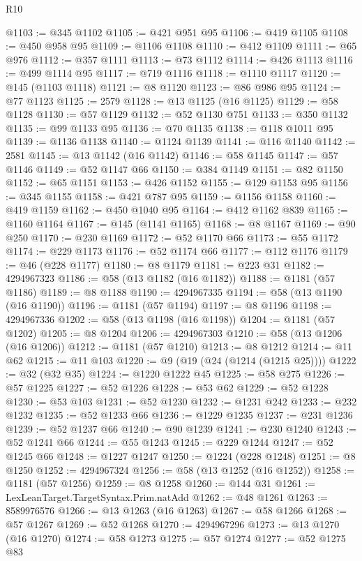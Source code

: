\begin{lexlean}{R10}
\begin{coremodule}
@1103 := @345 @1102
@1105 := @421 @951 @95
@1106 := @419 @1105
@1108 := @450 @958 @95
@1109 := @1106 @1108
@1110 := @412 @1109
@1111 := @65 @976
@1112 := @357 @1111
@1113 := @73 @1112
@1114 := @426 @1113
@1116 := @499 @1114 @95
@1117 := @719 @1116
@1118 := @1110 @1117
@1120 := @145 (@1103 @1118)
@1121 := @8 @1120
@1123 := @86 @986 @95
@1124 := @77 @1123
@1125 := 2579
@1128 := @13 @1125 (@16 @1125)
@1129 := @58 @1128
@1130 := @57 @1129
@1132 := @52 @1130 @751
@1133 := @350 @1132
@1135 := @99 @1133 @95
@1136 := @70 @1135
@1138 := @118 @1011 @95
@1139 := @1136 @1138
@1140 := @1124 @1139
@1141 := @116 @1140
@1142 := 2581
@1145 := @13 @1142 (@16 @1142)
@1146 := @58 @1145
@1147 := @57 @1146
@1149 := @52 @1147 @66
@1150 := @384 @1149
@1151 := @82 @1150
@1152 := @65 @1151
@1153 := @426 @1152
@1155 := @129 @1153 @95
@1156 := @345 @1155
@1158 := @421 @787 @95
@1159 := @1156 @1158
@1160 := @419 @1159
@1162 := @450 @1040 @95
@1164 := @412 @1162 @839
@1165 := @1160 @1164
@1167 := @145 (@1141 @1165)
@1168 := @8 @1167
@1169 := @90 @250
@1170 := @230 @1169
@1172 := @52 @1170 @66
@1173 := @55 @1172
@1174 := @229 @1173
@1176 := @52 @1174 @66
@1177 := @112 @1176
@1179 := @46 (@228 @1177)
@1180 := @8 @1179
@1181 := @223 @31
@1182 := 4294967323
@1186 := @58 (@13 @1182 (@16 @1182))
@1188 := @1181 (@57 @1186)
@1189 := @8 @1188
@1190 := 4294967335
@1194 := @58 (@13 @1190 (@16 @1190))
@1196 := @1181 (@57 @1194)
@1197 := @8 @1196
@1198 := 4294967336
@1202 := @58 (@13 @1198 (@16 @1198))
@1204 := @1181 (@57 @1202)
@1205 := @8 @1204
@1206 := 4294967303
@1210 := @58 (@13 @1206 (@16 @1206))
@1212 := @1181 (@57 @1210)
@1213 := @8 @1212
@1214 := @11 @62
@1215 := @11 @103
@1220 := @9 (@19 (@24 (@1214 (@1215 @25))))
@1222 := @32 (@32 @35)
@1224 := @1220 @1222 @45
@1225 := @58 @275
@1226 := @57 @1225
@1227 := @52 @1226
@1228 := @53 @62
@1229 := @52 @1228
@1230 := @53 @103
@1231 := @52 @1230
@1232 := @1231 @242
@1233 := @232 @1232
@1235 := @52 @1233 @66
@1236 := @1229 @1235
@1237 := @231 @1236
@1239 := @52 @1237 @66
@1240 := @90 @1239
@1241 := @230 @1240
@1243 := @52 @1241 @66
@1244 := @55 @1243
@1245 := @229 @1244
@1247 := @52 @1245 @66
@1248 := @1227 @1247
@1250 := @1224 (@228 @1248)
@1251 := @8 @1250
@1252 := 4294967324
@1256 := @58 (@13 @1252 (@16 @1252))
@1258 := @1181 (@57 @1256)
@1259 := @8 @1258
@1260 := @144 @31
@1261 := LexLeanTarget.TargetSyntax.Prim.natAdd
@1262 := @48 @1261
@1263 := 8589976576
@1266 := @13 @1263 (@16 @1263)
@1267 := @58 @1266
@1268 := @57 @1267
@1269 := @52 @1268
@1270 := 4294967296
@1273 := @13 @1270 (@16 @1270)
@1274 := @58 @1273
@1275 := @57 @1274
@1277 := @52 @1275 @83

\end{coremodule}
\end{lexlean}
